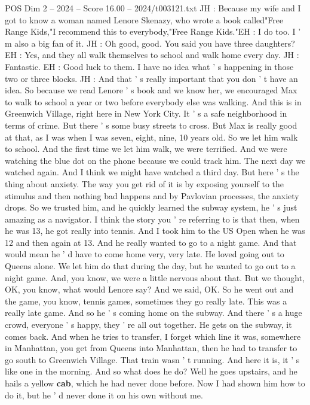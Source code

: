 \begin{textsample}{POS Dim 2 – 2024 – Score 16.00 – 2024/t003121.txt}
JH : Because my wife and I got to know a woman named Lenore Skenazy, who wrote a book called"Free Range Kids,"I recommend this to everybody,"Free Range Kids."EH : I do too.
I ' m also a big fan of it.
JH : Oh good, good.
You said you have three daughters?
EH : Yes, and they all walk themselves to school and walk home every day.
JH : Fantastic.
EH : Good luck to them.
I have no idea what ' s happening in those two or three blocks.
JH : And that ' s really important that you don ' t have an idea.
So because we read Lenore ' s book and we know her, we encouraged Max to walk to school a year or two before everybody else was walking.
And this is in Greenwich Village, right here in New York City.
It ' s a safe neighborhood in terms of crime.
But there ' s some busy streets to cross.
But Max is really good at that, as I was when I was seven, eight, nine, 10 years old.
So we let him walk to school.
And the first time we let him walk, we were terrified.
And we were watching the blue dot on the phone because we could track him.
The next day we watched again.
And I think we might have watched a third day.
But here ' s the thing about anxiety.
The way you get rid of it is by exposing yourself to the stimulus and then nothing bad happens and by Pavlovian processes, the anxiety drops.
So we trusted him, and he quickly learned the subway system, he ' s just amazing as a navigator.
I think the story you ' re referring to is that then, when he was 13, he got really into tennis.
And I took him to the US Open when he was 12 and then again at 13.
And he really wanted to go to a night game.
And that would mean he ' d have to come home very, very late.
He loved going out to Queens alone.
We let him do that during the day, but he wanted to go out to a night game.
And, you know, we were a little nervous about that.
But we thought, OK, you know, what would Lenore say?
And we said, OK.
So he went out and the game, you know, tennis games, sometimes they go really late.
This was a really late game.
And so he ' s coming home on the subway.
And there ' s a huge crowd, everyone ' s happy, they ' re all out together.
He gets on the subway, it comes back.
And when he tries to transfer, I forget which line it was, somewhere in Manhattan, you get from Queens into Manhattan, then he had to transfer to go south to Greenwich Village.
That train wasn ' t running.
And here it is, it ' s like one in the morning.
And so what does he do?
Well he goes upstairs, and he hails a yellow \textbf{cab}, which he had never done before.
Now I had shown him how to do it, but he ' d never done it on his own without me.

\end{textsample}
